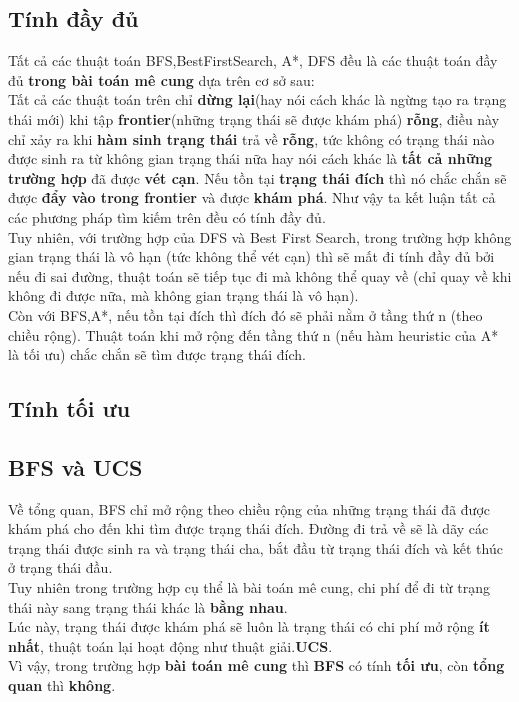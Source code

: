 \documentclass[11pt]{scrartcl} %
\begin{document}
\subsection{Tính đầy đủ}
Tất cả các thuật toán BFS,BestFirstSearch, A*, DFS đều là các thuật toán đầy đủ \textbf{trong bài toán mê cung} dựa trên cơ sở sau:\\
	Tất cả các thuật toán trên chỉ \textbf{dừng lại}(hay nói cách khác là ngừng tạo ra trạng thái mới) khi tập \textbf{frontier}(những trạng thái sẽ được khám phá) \textbf{rỗng}, điều này chỉ xảy ra khi \textbf{hàm sinh trạng thái} trả về \textbf{rỗng}, tức không có trạng thái nào được sinh ra từ không gian trạng thái nữa hay nói cách khác là \textbf{tất cả những trường hợp} đã được \textbf{vét cạn}. Nếu tồn tại \textbf{trạng thái đích} thì nó chắc chắn sẽ được \textbf{đẩy vào trong frontier} và được \textbf{khám phá}. Như vậy ta kết luận tất cả các phương pháp tìm kiếm trên đều có tính đầy đủ.\\
Tuy nhiên, với trường hợp của DFS và Best First Search, trong trường hợp không gian trạng thái là vô hạn (tức không thể vét cạn) thì sẽ mất đi tính đầy đủ bởi nếu đi sai đường, thuật toán sẽ tiếp tục đi mà không thể quay về (chỉ quay về khi không đi được nữa, mà không gian trạng thái là vô hạn).\\
Còn với BFS,A*, nếu tồn tại đích thì đích đó sẽ phải nằm ở tầng thứ n (theo chiều rộng). Thuật toán khi mở rộng đến tầng thứ n (nếu hàm heuristic của A* là tối ưu) chắc chắn sẽ tìm được trạng thái đích.\\
\subsection{Tính tối ưu}
\subsection{BFS và UCS}
Về tổng quan, BFS chỉ mở rộng theo chiều rộng của những trạng thái đã được khám phá cho đến khi tìm được trạng thái đích. Đường đi trả về sẽ là dãy các trạng thái được sinh ra và trạng thái cha, bắt đầu từ trạng thái đích và kết thúc ở trạng thái đầu.\\
Tuy nhiên trong trường hợp cụ thể là bài toán mê cung, chi phí để đi từ trạng thái này sang trạng thái khác là \textbf{bằng nhau}.\\
Lúc này, trạng thái được khám phá sẽ luôn là trạng thái có chi phí mở rộng \textbf{ít nhất}, thuật toán lại hoạt động như thuật giải.\textbf{UCS}.\\
Vì vậy, trong trường hợp \textbf{bài toán mê cung} thì \textbf{BFS} có tính \textbf{tối ưu}, còn \textbf{tổng quan} thì \textbf{không}.
\end{document}
